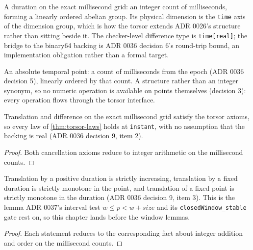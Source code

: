 \begin{definition}[Duration]
  \label{def:duration}\leanok
  A duration on the exact millisecond grid: an integer count of
  milliseconds, forming a linearly ordered abelian group.  Its physical
  dimension is the \texttt{time} axis of the dimension group, which is how
  the torsor extends ADR 0026's structure rather than sitting beside it.
  The checker-level difference type is \texttt{time[real]}; the bridge to
  the binary64 backing is ADR 0036 decision 6's round-trip bound, an
  implementation obligation rather than a formal target.
\end{definition}

\begin{definition}[Instant]
  \label{def:instant}\leanok
  An absolute temporal point: a count of milliseconds from the epoch
  (ADR 0036 decision 5), linearly ordered by that count.  A structure
  rather than an integer synonym, so no numeric operation is available on
  points themselves (decision 3): every operation flows through the torsor
  interface.
\end{definition}

\begin{theorem}
  \label{thm:instant-torsor}
  \leanok
  Translation and difference on the exact millisecond grid satisfy the
  torsor axioms, so every law of \ref{thm:torsor-laws} holds at
  \texttt{instant}, with no assumption that the backing is real
  (ADR 0036 decision 9, item 2).
\end{theorem}
\begin{proof}\leanok
  Both cancellation axioms reduce to integer arithmetic on the
  millisecond counts.
\end{proof}

\begin{theorem}
  \label{thm:instant-order-compat}
  \leanok
  Translation by a positive duration is strictly increasing, translation
  by a fixed duration is strictly monotone in the point, and translation
  of a fixed point is strictly monotone in the duration (ADR 0036
  decision 9, item 3).  This is the lemma ADR 0037's interval test
  $w \le p < w + \mathit{size}$ and its \texttt{closedWindow\_stable}
  gate rest on, so this chapter lands before the window lemmas.
\end{theorem}
\begin{proof}\leanok
  Each statement reduces to the corresponding fact about integer
  addition and order on the millisecond counts.
\end{proof}

